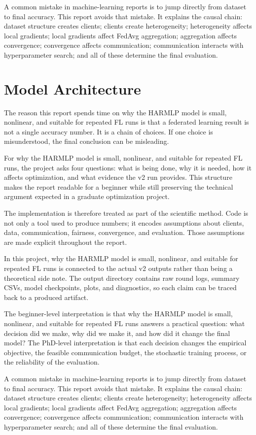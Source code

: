 \documentclass[11pt]{report}
\begin{document}
A common mistake in machine-learning reports is to jump directly from dataset to final accuracy.
This report avoids that mistake. It explains the causal chain: dataset structure creates clients;
clients create heterogeneity; heterogeneity affects local gradients; local gradients affect FedAvg
aggregation; aggregation affects convergence; convergence affects communication; communication
interacts with hyperparameter search; and all of these determine the final evaluation.

\chapter{Model Architecture}
The reason this report spends time on why the HARMLP model is small, nonlinear, and suitable for
repeated FL runs is that a federated learning result is not a single accuracy number. It is a chain
of choices. If one choice is misunderstood, the final conclusion can be misleading.

For why the HARMLP model is small, nonlinear, and suitable for repeated FL runs, the project asks
four questions: what is being done, why it is needed, how it affects optimization, and what evidence
the v2 run provides. This structure makes the report readable for a beginner while still preserving
the technical argument expected in a graduate optimization project.

The implementation is therefore treated as part of the scientific method. Code is not only a tool
used to produce numbers; it encodes assumptions about clients, data, communication, fairness,
convergence, and evaluation. Those assumptions are made explicit throughout the report.

In this project, why the HARMLP model is small, nonlinear, and suitable for repeated FL runs is
connected to the actual v2 outputs rather than being a theoretical side note. The output directory
contains raw round logs, summary CSVs, model checkpoints, plots, and diagnostics, so each claim can
be traced back to a produced artifact.

The beginner-level interpretation is that why the HARMLP model is small, nonlinear, and suitable for
repeated FL runs answers a practical question: what decision did we make, why did we make it, and
how did it change the final model? The PhD-level interpretation is that each decision changes the
empirical objective, the feasible communication budget, the stochastic training process, or the
reliability of the evaluation.

A common mistake in machine-learning reports is to jump directly from dataset to final accuracy.
This report avoids that mistake. It explains the causal chain: dataset structure creates clients;
clients create heterogeneity; heterogeneity affects local gradients; local gradients affect FedAvg
aggregation; aggregation affects convergence; convergence affects communication; communication
interacts with hyperparameter search; and all of these determine the final evaluation.
\end{document}
